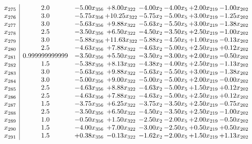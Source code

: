 \documentclass[8pt]{article}
\begin{document}
\[\begin{array}{c| c c@{\hskip 2pt} c@{\hskip 2pt} c@{\hskip 2pt} c@{\hskip 2pt} c@{\hskip 2pt} c@{\hskip 2pt} }
 x_{275}   &  2.0 & -5.00 x_{356} & +  8.00 x_{322} & -4.00 x_{2} & -4.00 x_{5} & +  2.00 x_{219} & -1.00 x_{202}\\
 x_{276}   &  3.0 & -5.75 x_{356} & + 10.25 x_{322} & -5.75 x_{2} & -5.00 x_{5} & +  3.00 x_{219} & -1.25 x_{202}\\
 x_{277}   &  3.0 & -5.63 x_{356} & +  9.88 x_{322} & -5.63 x_{2} & -5.50 x_{5} & +  3.00 x_{219} & -1.38 x_{202}\\
 x_{278}   &  2.5 & -3.50 x_{356} & +  6.50 x_{322} & -4.50 x_{2} & -3.50 x_{5} & +  2.50 x_{219} & -1.00 x_{202}\\
 x_{279}   &  3.0 & -5.88 x_{356} & + 11.63 x_{322} & -5.88 x_{2} & -4.50 x_{5} & +  1.00 x_{219} & -0.13 x_{202}\\
 x_{280}   &  2.5 & -4.63 x_{356} & +  7.88 x_{322} & -4.63 x_{2} & -5.00 x_{5} & +  2.50 x_{219} & +  0.12 x_{202}\\
 x_{281}   &  0.999999999999 & -3.50 x_{356} & +  5.50 x_{322} & -3.50 x_{2} & -3.00 x_{5} & +  2.00 x_{219} & -0.50 x_{202}\\
 x_{282}   &  1.5 & -5.38 x_{356} & +  8.13 x_{322} & -4.38 x_{2} & -4.00 x_{5} & +  2.50 x_{219} & -1.13 x_{202}\\
 x_{283}   &  3.0 & -5.63 x_{356} & +  9.88 x_{322} & -5.63 x_{2} & -5.50 x_{5} & +  3.00 x_{219} & -1.38 x_{202}\\
 x_{284}   &  3.0 & -5.00 x_{356} & +  9.00 x_{322} & -5.00 x_{2} & -5.00 x_{5} & +  2.00 x_{219} & -0.00 x_{202}\\
 x_{285}   &  2.5 & -4.63 x_{356} & +  8.88 x_{322} & -4.63 x_{2} & -5.00 x_{5} & +  1.50 x_{219} & +  0.12 x_{202}\\
 x_{286}   &  2.5 & -4.63 x_{356} & +  7.88 x_{322} & -4.63 x_{2} & -5.00 x_{5} & +  2.50 x_{219} & +  0.12 x_{202}\\
 x_{287}   &  1.5 & -3.75 x_{356} & +  6.25 x_{322} & -3.75 x_{2} & -3.50 x_{5} & +  2.50 x_{219} & -0.75 x_{202}\\
 x_{288}   &  2.5 & -3.50 x_{356} & +  6.50 x_{322} & -4.50 x_{2} & -3.50 x_{5} & +  2.50 x_{219} & -1.00 x_{202}\\
 x_{289}   &  1.0 & -0.50 x_{356} & +  1.50 x_{322} & -2.50 x_{2} & -2.00 x_{5} & +  2.00 x_{219} & -0.50 x_{202}\\
 x_{290}   &  1.5 & -4.00 x_{356} & +  7.00 x_{322} & -3.00 x_{2} & -2.50 x_{5} & +  0.50 x_{219} & +  0.50 x_{202}\\
 x_{291}   &  1.5 & +  0.38 x_{356} & -0.13 x_{322} & -1.62 x_{2} & -2.00 x_{5} & +  1.50 x_{219} & +  1.13 x_{202}\\

\end{array}\]
\end{document}
